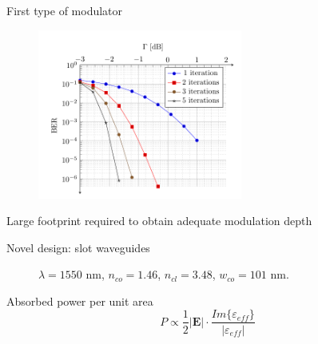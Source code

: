 \documentclass[handout,xcolor={usenames,dvipsnames},11pt]{beamer}
\begin{document}
\begin{frame}[c]{First type of modulator}
    \begin{figure}
        \begin{center}
           \includegraphics[width=0.6\textwidth]{./images/BER}
        \end{center}
        \caption{\cite{Cho2011}}
    \end{figure}\pause
    \begin{center}
        Large footprint required to obtain adequate modulation depth        
    \end{center}
\end{frame}
\begin{frame}[c]{Novel design: slot waveguides}
    \begin{figure}
        \centering
        \caption{$\lambda = 1550$ nm, $n_{co} = 1.46$, $n_{cl} = 3.48$, $w_{co} = 101$ nm. \cite{Xu2004}}
    \end{figure}\pause
    \begin{alertblock}{Absorbed power per unit area}
        \[
            P \propto \frac{1}{2} |\mathbf{E}| \cdot \frac{Im\{\varepsilon_{eff}\}}{|\varepsilon_{eff}|} 
        \]
    \end{alertblock}
\end{frame}  
\end{document}
